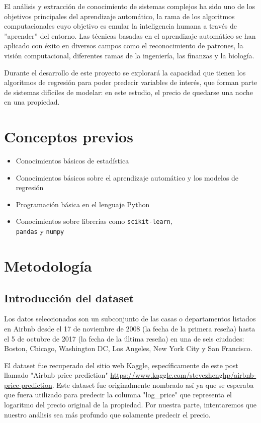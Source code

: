 \documentclass[sigconf,authorversion,nonacm]{acmart}
\begin{document}
El análisis y extracción de conocimiento de sistemas complejos ha sido uno de los objetivos principales del aprendizaje automático, la rama de los algoritmos computacionales cuyo objetivo es emular la inteligencia humana a través de ”aprender” del entorno. Las técnicas basadas en el aprendizaje automático se han aplicado con éxito en diversos campos como el reconocimiento de patrones, la visión computacional, diferentes ramas de la ingeniería, las finanzas y la biología\cite{el2015machine}.

Durante el desarrollo de este proyecto se explorará la capacidad que tienen los algoritmos de regresión para poder predecir variables de interés, que forman parte de sistemas difíciles de modelar: en este estudio, el precio de quedarse una noche en una propiedad.


\section{Conceptos previos}
\begin{itemize}
  \item Conocimientos básicos de estadística
  \item Conocimientos básicos sobre el aprendizaje automático y los modelos de regresión
  \item Programación básica en el lenguaje Python
  \item Conocimientos sobre librerías como \texttt{scikit-learn},\\\texttt{pandas} y \texttt{numpy}
\end{itemize}


\section{Metodología}
\subsection{Introducción del dataset}
Los datos seleccionados son un subconjunto de las casas o departamentos listados en Airbnb desde el 17 de noviembre de 2008 (la fecha de la primera reseña) hasta el 5 de octubre de 2017 (la fecha de la última reseña) en una de seis ciudades: Boston, Chicago, Washington DC, Los Angeles, New York City y San Francisco. 

El dataset fue recuperado del sitio web Kaggle, específicamente de este post llamado "Airbnb price prediction" \url{https://www.kaggle.com/stevezhenghp/airbnb-price-prediction}. Este dataset fue originalmente nombrado así ya que se esperaba que fuera utilizado para predecir la columna "log\_price" que representa el logaritmo del precio original de la propiedad. Por nuestra parte, intentaremos que nuestro análisis sea más profundo que solamente predecir el precio. 
\end{document}

